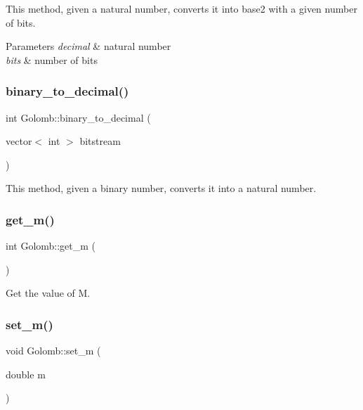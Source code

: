 This method, given a natural number, converts it into base2 with a given number of bits.


\begin{DoxyParams}{Parameters}
{\em decimal} & natural number \\
\hline
{\em bits} & number of bits \\
\hline
\end{DoxyParams}
\mbox{\label{classGolomb_a13a756ac1e640acdccab04cead87d77b}} 
\subsubsection{\texorpdfstring{binary\+\_\+to\+\_\+decimal()}{binary\_to\_decimal()}}
{\footnotesize\ttfamily int Golomb\+::binary\+\_\+to\+\_\+decimal (\begin{DoxyParamCaption}\item[{vector$<$ int $>$}]{bitstream }\end{DoxyParamCaption})\hspace{0.3cm}{\ttfamily [inline]}}

This method, given a binary number, converts it into a natural number. \mbox{\label{classGolomb_aa45900c84d473bbfc3d0de0b8879d10e}} 
\subsubsection{\texorpdfstring{get\+\_\+m()}{get\_m()}}
{\footnotesize\ttfamily int Golomb\+::get\+\_\+m (\begin{DoxyParamCaption}{ }\end{DoxyParamCaption})\hspace{0.3cm}{\ttfamily [inline]}}

Get the value of \textquotesingle{}M\textquotesingle{}. \mbox{\label{classGolomb_a8d8c2f271ad2e3716ddbba7fcde15619}} 
\subsubsection{\texorpdfstring{set\+\_\+m()}{set\_m()}}
{\footnotesize\ttfamily void Golomb\+::set\+\_\+m (\begin{DoxyParamCaption}\item[{double}]{m }\end{DoxyParamCaption})\hspace{0.3cm}{\ttfamily [inline]}}

